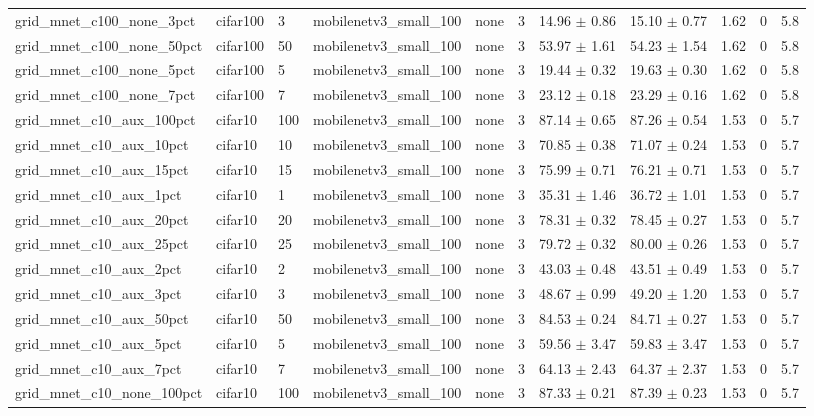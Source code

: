 \begin{tabular}{lllllllllll}
grid_mnet_c100_none_3pct & cifar100 & 3 & mobilenetv3_small_100 & none & 3 & 14.96 $\pm$ 0.86 & 15.10 $\pm$ 0.77 & 1.62 & 0 & 5.8 \\
grid_mnet_c100_none_50pct & cifar100 & 50 & mobilenetv3_small_100 & none & 3 & 53.97 $\pm$ 1.61 & 54.23 $\pm$ 1.54 & 1.62 & 0 & 5.8 \\
grid_mnet_c100_none_5pct & cifar100 & 5 & mobilenetv3_small_100 & none & 3 & 19.44 $\pm$ 0.32 & 19.63 $\pm$ 0.30 & 1.62 & 0 & 5.8 \\
grid_mnet_c100_none_7pct & cifar100 & 7 & mobilenetv3_small_100 & none & 3 & 23.12 $\pm$ 0.18 & 23.29 $\pm$ 0.16 & 1.62 & 0 & 5.8 \\
grid_mnet_c10_aux_100pct & cifar10 & 100 & mobilenetv3_small_100 & none & 3 & 87.14 $\pm$ 0.65 & 87.26 $\pm$ 0.54 & 1.53 & 0 & 5.7 \\
grid_mnet_c10_aux_10pct & cifar10 & 10 & mobilenetv3_small_100 & none & 3 & 70.85 $\pm$ 0.38 & 71.07 $\pm$ 0.24 & 1.53 & 0 & 5.7 \\
grid_mnet_c10_aux_15pct & cifar10 & 15 & mobilenetv3_small_100 & none & 3 & 75.99 $\pm$ 0.71 & 76.21 $\pm$ 0.71 & 1.53 & 0 & 5.7 \\
grid_mnet_c10_aux_1pct & cifar10 & 1 & mobilenetv3_small_100 & none & 3 & 35.31 $\pm$ 1.46 & 36.72 $\pm$ 1.01 & 1.53 & 0 & 5.7 \\
grid_mnet_c10_aux_20pct & cifar10 & 20 & mobilenetv3_small_100 & none & 3 & 78.31 $\pm$ 0.32 & 78.45 $\pm$ 0.27 & 1.53 & 0 & 5.7 \\
grid_mnet_c10_aux_25pct & cifar10 & 25 & mobilenetv3_small_100 & none & 3 & 79.72 $\pm$ 0.32 & 80.00 $\pm$ 0.26 & 1.53 & 0 & 5.7 \\
grid_mnet_c10_aux_2pct & cifar10 & 2 & mobilenetv3_small_100 & none & 3 & 43.03 $\pm$ 0.48 & 43.51 $\pm$ 0.49 & 1.53 & 0 & 5.7 \\
grid_mnet_c10_aux_3pct & cifar10 & 3 & mobilenetv3_small_100 & none & 3 & 48.67 $\pm$ 0.99 & 49.20 $\pm$ 1.20 & 1.53 & 0 & 5.7 \\
grid_mnet_c10_aux_50pct & cifar10 & 50 & mobilenetv3_small_100 & none & 3 & 84.53 $\pm$ 0.24 & 84.71 $\pm$ 0.27 & 1.53 & 0 & 5.7 \\
grid_mnet_c10_aux_5pct & cifar10 & 5 & mobilenetv3_small_100 & none & 3 & 59.56 $\pm$ 3.47 & 59.83 $\pm$ 3.47 & 1.53 & 0 & 5.7 \\
grid_mnet_c10_aux_7pct & cifar10 & 7 & mobilenetv3_small_100 & none & 3 & 64.13 $\pm$ 2.43 & 64.37 $\pm$ 2.37 & 1.53 & 0 & 5.7 \\
grid_mnet_c10_none_100pct & cifar10 & 100 & mobilenetv3_small_100 & none & 3 & 87.33 $\pm$ 0.21 & 87.39 $\pm$ 0.23 & 1.53 & 0 & 5.7 \\

\end{tabular}
